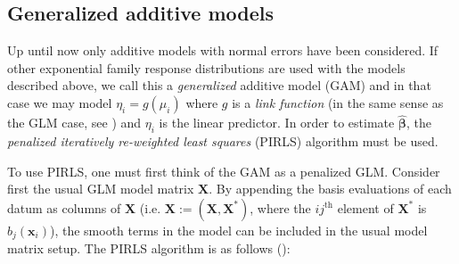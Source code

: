 \subsection{Generalized additive models}
\label{intro-extending-gams}

Up until now only additive models with normal errors have been considered. If other exponential family response distributions are used with the models described above, we call this a \textit{generalized} additive model (GAM)  and in that case we may model $\eta_i=g(\mu_i)$ where $g$ is a \textit{link function} (in the same sense as the GLM case, see \cite[p. 8]{GEEbook}) and $\eta_i$ is the linear predictor. In order to estimate $\bm{\hat{\beta}}$, the \textit{penalized iteratively re-weighted least squares} (PIRLS) algorithm must be used. 

To use PIRLS, one must first think of the GAM as a penalized GLM. Consider first the usual GLM model matrix $\mathbf{X}$. By appending the basis evaluations of each datum as columns of $\mathbf{X}$ (i.e. $\mathbf{X}:=\left ( \mathbf{X},\mathbf{X}^* \right )$, where the $ij^\text{th}$ element of $\mathbf{X}^*$ is  $b_j(\mathbf{x}_i)$), the smooth terms in the model can be included in the usual model matrix setup. The PIRLS algorithm is as follows (\cite[p. 138]{simonbook}):

